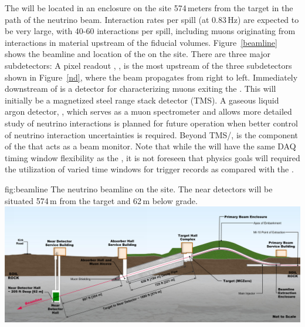 \documentclass[../main-v1.tex]{subfiles}
\begin{document}
 The   will be located in an enclosure on the  site 574\,meters from the target %
 in the path of the neutrino beam.    Interaction rates per spill (at 0.83\,Hz) are expected to be very large, with 40-60 interactions per spill, including muons originating from interactions in material upstream of the fiducial volumes. Figure~\ref{beamline} shows the beamline and location of the  on the  site. There are three major subdetectors:
 A pixel readout %
 , , is  the most upstream of the three subdetectors shown in Figure~\ref{nd}, where the beam propagates  from right to left. Immediately downstream of  is a detector for characterizing muons exiting the . This will initially be a magnetized steel range stack detector (TMS). A gaseous liquid argon detector, , which serves %
 as  a muon spectrometer and allows more detailed study of neutrino interactions is planned for future operation when better control of neutrino interaction uncertainties is required. %
 Beyond TMS/, is the  component of the  that acts as a beam monitor. %
Note that while the  will have the same DAQ timing window flexibility as the , it is not foreseen that  physics goals will required the utilization of varied time windows for trigger records as compared with the . %


 \begin{dunefigure}
{fig:beamline} %
{The neutrino beamline on the  site. The near detectors will be situated 574\,m from the target and 62\,m below grade.}
\includegraphics[height=0.3\textwidth]{graphics/IntroFigures/beamline-sideview.png}
\end{dunefigure}
\end{document}
